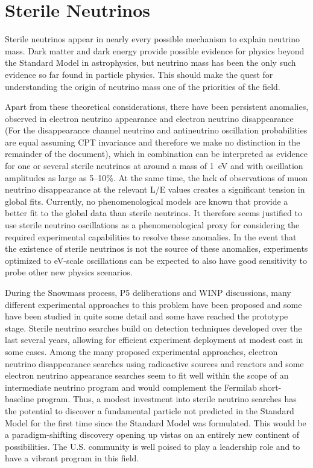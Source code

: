 \section{Sterile Neutrinos}
\label{sec:Sterile}

Sterile neutrinos appear in nearly every possible mechanism to explain
neutrino mass. Dark matter and dark energy provide possible evidence
for physics beyond the Standard Model in astrophysics, but neutrino
mass has been the only such evidence so far found in particle
physics. This should make the quest for understanding the origin of
neutrino mass one of the priorities of the field.

Apart from these theoretical considerations, there have been
persistent anomalies, observed in electron neutrino appearance and
electron neutrino disappearance (For the disappearance channel
neutrino and antineutrino oscillation probabilities are equal assuming
CPT invariance and therefore we make no distinction in the remainder of
the document), which in combination can be interpreted as evidence
for one or several sterile neutrinos at around a mass of 1~eV and with
oscillation amplitudes as large as 5--10\%. At the same time, the lack
of observations of muon neutrino disappearance at the relevant L/E
values creates a significant tension in global fits. Currently, no
phenomenological models are known that provide a better fit to the
global data than sterile neutrinos. It therefore seems justified to
use sterile neutrino oscillations as a phenomenological proxy for
considering the required experimental capabilities to resolve these
anomalies. In the event that the existence of sterile neutrinos is not
the source of these anomalies, experiments optimized to eV-scale
oscillations can be expected to also have good sensitivity to probe
other new physics scenarios.

During the Snowmass process, P5 deliberations and WINP discussions,
many different experimental approaches to this problem have been
proposed and some have been studied in quite some detail and some have
reached the prototype stage. Sterile neutrino searches build on
detection techniques developed over the last several years, allowing
for efficient experiment deployment at modest cost in some cases.
Among the many proposed experimental approaches, electron neutrino
disappearance searches using radioactive sources and reactors and some
electron neutrino appearance searches seem to fit well within the
scope of an intermediate neutrino program and would complement the
Fermilab short-baseline program. Thus, a modest investment into
sterile neutrino searches has the potential to discover a fundamental
particle not predicted in the Standard Model for the first time since
the Standard Model was formulated. This would be a paradigm-shifting
discovery opening up vistas on an entirely new continent of
possibilities. The U.S. community is well poised to play a leadership
role and to have a vibrant program in this field.

